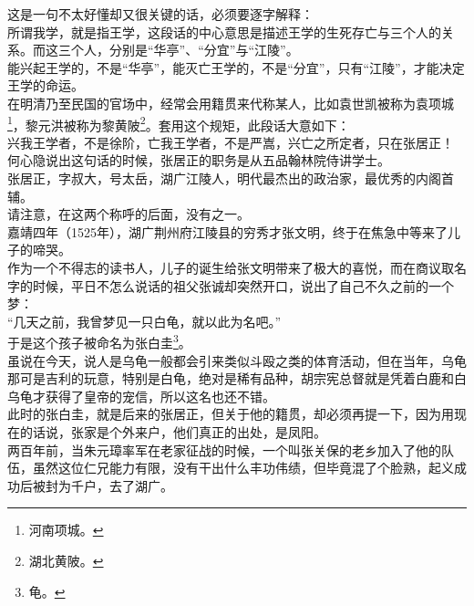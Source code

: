 \begin{multicols}{\theparacolNo}
这是一句不太好懂却又很关键的话，必须要逐字解释：\\

所谓我学，就是指王学，这段话的中心意思是描述王学的生死存亡与三个人的关系。而这三个人，分别是“华亭”、“分宜”与“江陵”。\\

能兴起王学的，不是“华亭”，能灭亡王学的，不是“分宜”，只有“江陵”，才能决定王学的命运。\\

在明清乃至民国的官场中，经常会用籍贯来代称某人，比如袁世凯被称为袁项城\footnote{河南项城。}，黎元洪被称为黎黄陂\footnote{湖北黄陂。}。套用这个规矩，此段话大意如下：\\

兴我王学者，不是徐阶，亡我王学者，不是严嵩，兴亡之所定者，只在张居正！\\

何心隐说出这句话的时候，张居正的职务是从五品翰林院侍讲学士。\\

张居正，字叔大，号太岳，湖广江陵人，明代最杰出的政治家，最优秀的内阁首辅。\\

请注意，在这两个称呼的后面，没有之一。\\

嘉靖四年（1525年），湖广荆州府江陵县的穷秀才张文明，终于在焦急中等来了儿子的啼哭。\\

作为一个不得志的读书人，儿子的诞生给张文明带来了极大的喜悦，而在商议取名字的时候，平日不怎么说话的祖父张诚却突然开口，说出了自己不久之前的一个梦：\\

“几天之前，我曾梦见一只白龟，就以此为名吧。”\\

于是这个孩子被命名为张白圭\footnote{龟。}。\\

虽说在今天，说人是乌龟一般都会引来类似斗殴之类的体育活动，但在当年，乌龟那可是吉利的玩意，特别是白龟，绝对是稀有品种，胡宗宪总督就是凭着白鹿和白乌龟才获得了皇帝的宠信，所以这名也还不错。\\

此时的张白圭，就是后来的张居正，但关于他的籍贯，却必须再提一下，因为用现在的话说，张家是个外来户，他们真正的出处，是凤阳。\\

两百年前，当朱元璋率军在老家征战的时候，一个叫张关保的老乡加入了他的队伍，虽然这位仁兄能力有限，没有干出什么丰功伟绩，但毕竟混了个脸熟，起义成功后被封为千户，去了湖广。\\


\end{multicols}
